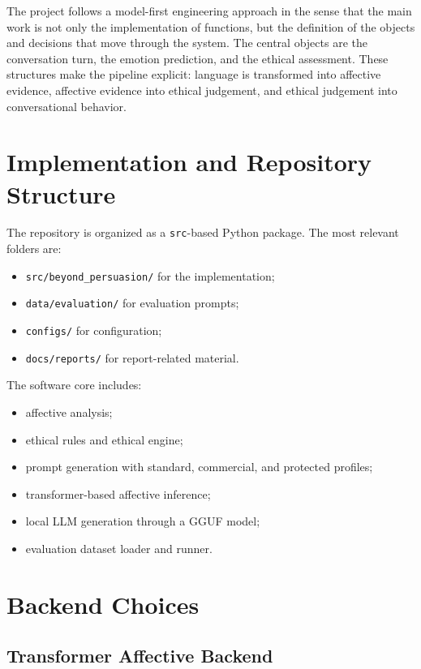 \documentclass[11pt,a4paper]{article}
\newcommand{\code}[1]{\texttt{#1}}
\begin{document}
The project follows a model-first engineering approach in the sense that the main work is
not only the implementation of functions, but the definition of the objects and decisions
that move through the system. The central objects are the conversation turn, the emotion
prediction, and the ethical assessment. These structures make the pipeline explicit:
language is transformed into affective evidence, affective evidence into ethical judgement,
and ethical judgement into conversational behavior.

\section{Implementation and Repository Structure}

The repository is organized as a \code{src}-based Python package. The most relevant folders are:

\begin{itemize}[leftmargin=1.8em]
\item \code{src/beyond\_persuasion/} for the implementation;
\item \code{data/evaluation/} for evaluation prompts;
\item \code{configs/} for configuration;
\item \code{docs/reports/} for report-related material.
\end{itemize}

The software core includes:

\begin{itemize}[leftmargin=1.8em]
\item affective analysis;
\item ethical rules and ethical engine;
\item prompt generation with standard, commercial, and protected profiles;
\item transformer-based affective inference;
\item local LLM generation through a GGUF model;
\item evaluation dataset loader and runner.
\end{itemize}

\section{Backend Choices}

\subsection{Transformer Affective Backend}
\end{document}
